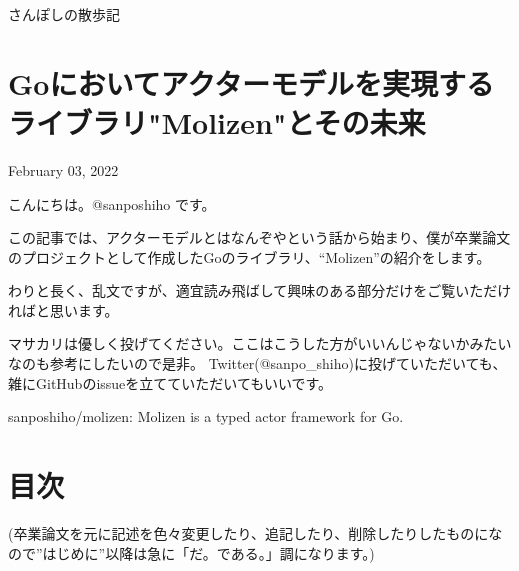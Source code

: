 さんぽしの散歩記

\section{Goにおいてアクターモデルを実現するライブラリ"Molizen"とその未来}

February 03, 2022

こんにちは。@sanposhiho です。

この記事では、アクターモデルとはなんぞやという話から始まり、僕が卒業論文のプロジェクトとして作成したGoのライブラリ、``Molizen''の紹介をします。

わりと長く、乱文ですが、適宜読み飛ばして興味のある部分だけをご覧いただければと思います。

マサカリは優しく投げてください。ここはこうした方がいいんじゃないかみたいなのも参考にしたいので是非。
Twitter(@sanpo\_shiho)に投げていただいても、雑にGitHubのissueを立てていただいてもいいです。

sanposhiho/molizen: Molizen is a typed actor framework for Go.

\section{目次}

(卒業論文を元に記述を色々変更したり、追記したり、削除したりしたものになので''はじめに''以降は急に「だ。である。」調になります。)

